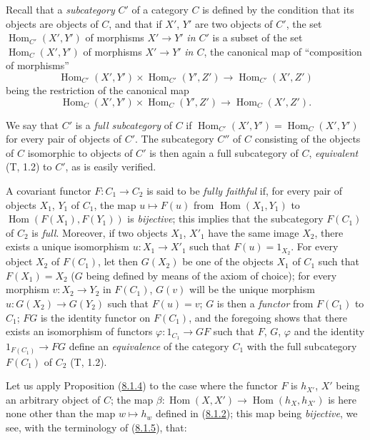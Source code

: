 \begin{env}[8.1.5]
\label{0.8.1.5}
Recall that a \emph{subcategory} $C'$ of a category $C$ is defined
by the condition that its objects are objects of $C$, and that if $X'$,
$Y'$ are two objects of $C'$, the set
$\operatorname{Hom}_{C'}(X',Y')$ of morphisms $X'\to Y'$ \emph{in
$C'$} is a subset of the set $\operatorname{Hom}_C(X',Y')$ of
morphisms $X'\to Y'$ \emph{in $C$}, the canonical map of
``composition of morphisms''
\[
  \operatorname{Hom}_{C'}(X',Y')\times\operatorname{Hom}_{C'}(Y',Z')
  \to\operatorname{Hom}_{C'}(X',Z')
\]
being the restriction of the canonical map
\[
  \operatorname{Hom}_C(X',Y')\times\operatorname{Hom}_C(Y',Z')
  \to\operatorname{Hom}_C(X',Z').
\]

We say that $C'$ is a \emph{full subcategory} of $C$ if
$\operatorname{Hom}_{C'}(X',Y')=\operatorname{Hom}_C(X',Y')$ for every
pair of objects of $C'$. The subcategory $C''$ of $C$ consisting of the
objects of $C$ isomorphic to objects of $C'$ is then again a full
subcategory of $C$, \emph{equivalent} (T, 1.2) to $C'$, as is easily
verified.

A covariant functor $F:C_1\to C_2$ is said to be \emph{fully faithful} if,
for every pair of objects $X_1$, $Y_1$ of $C_1$, the map
$u\mapsto F(u)$ from $\operatorname{Hom}(X_1,Y_1)$ to
$\operatorname{Hom}(F(X_1),F(Y_1))$ is \emph{bijective}; this implies that
the subcategory $F(C_1)$ of $C_2$ is \emph{full}. Moreover, if two
objects $X_1$, $X'_1$ have the same image $X_2$, there exists a unique
isomorphism $u:X_1\to X'_1$ such that $F(u)=1_{X_2}$. For every object $X_2$
of $F(C_1)$, let then $G(X_2)$ be one of the objects $X_1$ of $C_1$ such that
$F(X_1)=X_2$ ($G$ being defined by means of the axiom of choice); for every
morphism $v:X_2\to Y_2$ in $F(C_1)$, $G(v)$ will be the unique morphism
$u:G(X_2)\to G(Y_2)$ such that $F(u)=v$; $G$ is then a \emph{functor} from
$F(C_1)$ to $C_1$; $FG$ is the identity functor on $F(C_1)$, and the
foregoing shows that there exists an isomorphism of functors
$\varphi:1_{C_1}\to GF$ such that $F$, $G$, $\varphi$ and the identity
$1_{F(C_1)}\to FG$ define an \emph{equivalence} of the category $C_1$
with the full subcategory $F(C_1)$ of $C_2$ (T, 1.2).
\end{env}

\begin{env}[8.1.6]
\label{0.8.1.6}
Let us apply Proposition (\hyperref[0.8.1.4]{8.1.4}) to the case where the
functor $F$ is $h_{X'}$, $X'$ being an arbitrary object of $C$; the map
$\beta:\operatorname{Hom}(X,X')\to\operatorname{Hom}(h_X,h_{X'})$ is here
none other than the map $w\mapsto h_w$ defined in
(\hyperref[0.8.1.2]{8.1.2}); this map being \emph{bijective},
we see, with the terminology of (\hyperref[0.8.1.5]{8.1.5}), that:
\end{env}


